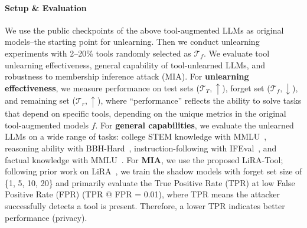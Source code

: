 \paragraph{Setup \& Evaluation}
We use the public checkpoints of the above tool-augmented LLMs as original models--the starting point for unlearning. Then we conduct unlearning experiments with 2--20\% tools randomly selected as $\mathcal{T}_f$.
We evaluate tool unlearning effectiveness, general capability of tool-unlearned LLMs, and robustness to membership inference attack (MIA). 
%
For \textbf{unlearning effectiveness}, we measure performance on test sets ($\mathcal{T}_T, \uparrow$), forget set ($\mathcal{T}_f, \downarrow$), and remaining set ($\mathcal{T}_r, \uparrow$), where ``performance'' reflects the ability to solve tasks that depend on specific tools, depending on the unique metrics in the original tool-augmented models $f$. 
%
For \textbf{general capabilities}, we evaluate the unlearned LLMs on a wide range of tasks: 
college STEM knowledge with MMLU~\citep{hendrycks2021measuring}, 
reasoning ability with BBH-Hard~\citep{suzgun-etal-2023-challenging}, 
instruction-following with IFEval~\citep{zhou2023instruction}, and 
factual knowledge with MMLU~\citep{hendrycks2021measuring}.
%
For \textbf{MIA}, we use the proposed LiRA-Tool; following prior work on LiRA~\citep{icul}, we train the shadow models with forget set size of \{1, 5, 10, 20\} and primarily evaluate the True Positive Rate (TPR) at low False Positive Rate (FPR) (TPR @ FPR = 0.01), where TPR means the attacker successfully detects a tool is present. Therefore, a lower TPR indicates better performance (privacy).





